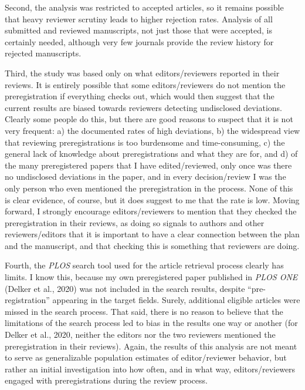 \documentclass[authordate, meta]{jote-new-article}
\begin{document}
	Second, the analysis was restricted to accepted articles, so it remains possible that heavy reviewer scrutiny leads to higher rejection rates. Analysis of all submitted and reviewed manuscripts, not just those that were accepted, is certainly needed, although very few journals provide the review history for rejected manuscripts.



	Third, the study was based only on what editors/reviewers reported in their reviews. It is entirely possible that some editors/reviewers do not mention the preregistration if everything checks out, which would then suggest that the current results are biased towards reviewers detecting undisclosed deviations. Clearly some people do this, but there are good reasons to suspect that it is not very frequent: a) the documented rates of high deviations, b) the widespread view that reviewing preregistrations is too burdensome and time-consuming, c) the general lack of knowledge about preregistrations and what they are for, and d) of the many preregistered papers that I have edited/reviewed, only once was there no undisclosed deviations in the paper, and in every decision/review I was the only person who even mentioned the preregistration in the process. None of this is clear evidence, of course, but it does suggest to me that the rate is low. Moving forward, I strongly encourage editors/reviewers to mention that they checked the preregistration in their reviews, as doing so signals to authors and other reviewers/editors that it is important to have a clear connection between the plan and the manuscript, and that checking this is something that reviewers are doing.



	Fourth, the \emph{PLOS} search tool used for the article retrieval process clearly has limits. I know this, because my own preregistered paper published in \emph{PLOS ONE} (Delker et al., 2020) was not included in the search results, despite “pre-registration” appearing in the target fields. Surely, additional eligible articles were missed in the search process. That said, there is no reason to believe that the limitations of the search process led to bias in the results one way or another (for Delker et al., 2020, neither the editors nor the two reviewers mentioned the preregistration in their reviews). Again, the results of this analysis are not meant to serve as generalizable population estimates of editor/reviewer behavior, but rather an initial investigation into how often, and in what way, editors/reviewers engaged with preregistrations during the review process.
\end{document}

